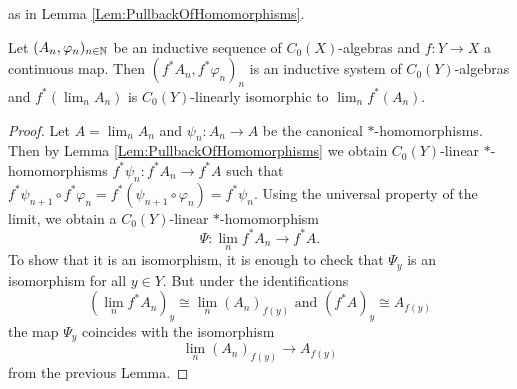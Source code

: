 	as in Lemma \ref{Lem:PullbackOfHomomorphisms}. 
	\begin{prop}\label{Prop:LimitsAndPullbacks}
		Let $(A_n,\varphi_n)_{n\in\mathbb N}$ be an inductive sequence of $C_0(X)$-al\-gebras and $f:Y\rightarrow X$ a continuous map.
		Then $(f^*A_n,f^*\varphi_n)_{n}$ is an inductive system of $C_0(Y)$-algebras and $f^*(\lim_n A_n)$ is $C_0(Y)$-linearly isomorphic to $\lim_n f^*(A_n)$.
	\end{prop}
	\begin{proof}
		Let $A=\lim_n A_n$ and $\psi_n:A_n\rightarrow A$ be the canonical $\ast$-homo\-morphisms. Then by Lemma \ref{Lem:PullbackOfHomomorphisms} we obtain $C_0(Y)$-linear $*$-homo\-morphisms $f^*\psi_n:f^*A_n\rightarrow f^*A$ such that $f^*\psi_{n+1}\circ f^*\varphi_n=f^*(\psi_{n+1}\circ \varphi_n)=f^*\psi_n$. Using the universal property of the limit, we obtain a $C_0(Y)$-linear $*$-homo\-morphism $$\Psi:\lim\limits_{n}f^*A_n\rightarrow f^*A.$$
		To show that it is an isomorphism, it is enough to check that $\Psi_y$ is an isomorphism for all $y\in Y$. But under the identifications
		$$(\lim_{n}f^*A_n)_y\cong \lim_{n}(A_n)_{f(y)}\text{ and }(f^*A)_y\cong A_{f(y)}$$ the map $\Psi_y$ coincides with the isomorphism 
		$$\lim\limits_{n}(A_n)_{f(y)}\rightarrow A_{f(y)}$$
		from the previous Lemma.
	\end{proof}
	
